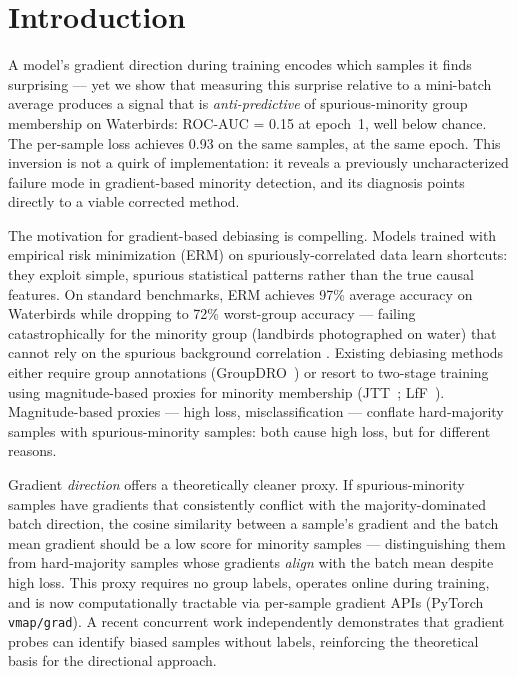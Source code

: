 \section{Introduction}

A model's gradient direction during training encodes which samples it finds surprising --- yet we show that measuring this surprise relative to a mini-batch average produces a signal that is \emph{anti-predictive} of spurious-minority group membership on Waterbirds: ROC-AUC = 0.15 at epoch~1, well below chance.
The per-sample loss achieves 0.93 on the same samples, at the same epoch.
This inversion is not a quirk of implementation: it reveals a previously uncharacterized failure mode in gradient-based minority detection, and its diagnosis points directly to a viable corrected method.

The motivation for gradient-based debiasing is compelling.
Models trained with empirical risk minimization (ERM) on spuriously-correlated data learn shortcuts: they exploit simple, spurious statistical patterns rather than the true causal features.
On standard benchmarks, ERM achieves 97\% average accuracy on Waterbirds while dropping to 72\% worst-group accuracy --- failing catastrophically for the minority group (landbirds photographed on water) that cannot rely on the spurious background correlation \citep{Sagawa2020Distributionally}.
Existing debiasing methods either require group annotations (GroupDRO~\citep{Sagawa2020Distributionally}) or resort to two-stage training using magnitude-based proxies for minority membership (JTT~\citep{Liu2021Just}; LfF~\citep{Nam2020Learning}).
Magnitude-based proxies --- high loss, misclassification --- conflate hard-majority samples with spurious-minority samples: both cause high loss, but for different reasons.

Gradient \emph{direction} offers a theoretically cleaner proxy.
If spurious-minority samples have gradients that consistently conflict with the majority-dominated batch direction, the cosine similarity between a sample's gradient and the batch mean gradient should be a low score for minority samples --- distinguishing them from hard-majority samples whose gradients \emph{align} with the batch mean despite high loss.
This proxy requires no group labels, operates online during training, and is now computationally tractable via per-sample gradient APIs (PyTorch \texttt{vmap/grad}).
A recent concurrent work \citep{BiasTrail2025Bias} independently demonstrates that gradient probes can identify biased samples without labels, reinforcing the theoretical basis for the directional approach.

